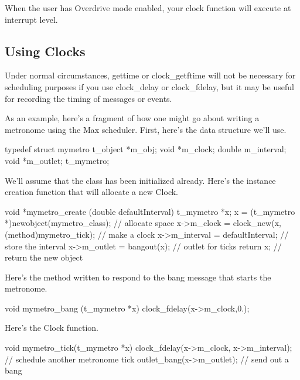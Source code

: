 When the user has Overdrive mode enabled, your clock function will execute at interrupt level.\hypertarget{group__clocks_clocks_using_clocks}{}\subsection{Using Clocks}\label{group__clocks_clocks_using_clocks}
Under normal circumstances, gettime or clock\_\-getftime will not be necessary for scheduling purposes if you use clock\_\-delay or clock\_\-fdelay, but it may be useful for recording the timing of messages or events.

As an example, here’s a fragment of how one might go about writing a metronome using the Max scheduler. First, here’s the data structure we’ll use.


\begin{DoxyCode}
    typedef struct mymetro { 
        t_object *m_obj; 
        void *m_clock; 
        double m_interval; 
        void *m_outlet; 
    } t_mymetro;
\end{DoxyCode}


We’ll assume that the class has been initialized already. Here’s the instance creation function that will allocate a new Clock.


\begin{DoxyCode}
    void *mymetro_create (double defaultInterval) 
    { 
        t_mymetro *x; 
        x = (t_mymetro *)newobject(mymetro_class); // allocate space
        x->m_clock = clock_new(x,(method)mymetro_tick); // make a clock
        x->m_interval = defaultInterval; // store the interval 
        x->m_outlet = bangout(x); // outlet for ticks
        return x; // return the new object
    } 
\end{DoxyCode}


Here’s the method written to respond to the bang message that starts the metronome.


\begin{DoxyCode}
    void mymetro_bang (t_mymetro *x) 
    { 
        clock_fdelay(x->m_clock,0.); 
    } 
\end{DoxyCode}


Here’s the Clock function.


\begin{DoxyCode}
    void mymetro_tick(t_mymetro *x) 
    { 
        clock_fdelay(x->m_clock, x->m_interval); 
        // schedule another metronome tick
        outlet_bang(x->m_outlet); // send out a bang
    } 
\end{DoxyCode}


